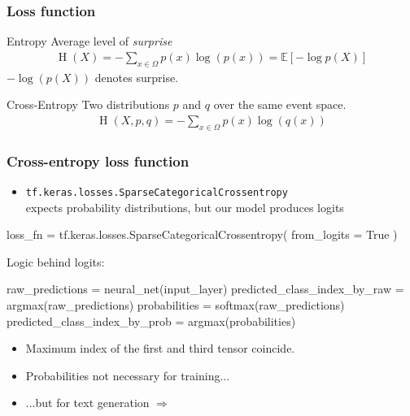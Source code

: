 \documentclass[17pt,institute=e10]{tuhh_presentation}
\begin{document}
\begin{frame}
  \frametitle{Loss function}
  \begin{block}{Entropy}
    Average level of \emph{surprise}
    \begin{align*}
      \operatorname{H}(X) = -\sum_{x \in \Omega} p(x) \log(p(x)) = \mathbb{E}[-\log p(X)]
    \end{align*}
    $-\log(p (X))$ denotes surprise.
  \end{block}
  \pause
\vspace{1cm}
  \begin{block}{Cross-Entropy}
    Two distributions $p$ and $q$ over the same event space.
    \begin{align*}
      \operatorname{H}(X,p,q) = -\sum_{x \in \Omega} p(x) \log(q(x)) 
    \end{align*}
  \end{block}

\end{frame}

\begin{frame}[fragile]

  \frametitle{Cross-entropy loss function}

  \begin{itemize}
  \item \texttt{tf.keras.losses.SparseCategoricalCrossentropy} \\
  expects probability distributions,
   but our model produces logits
  \end{itemize}
\vspace{1cm}
  \begin{python}
  loss_fn = tf.keras.losses.SparseCategoricalCrossentropy( from_logits = True )
  \end{python}
  \pause
\vspace{1cm}
Logic behind logits:
\begin{python}
  raw_predictions = neural_net(input_layer)
  predicted_class_index_by_raw = argmax(raw_predictions)
  probabilities = softmax(raw_predictions)
  predicted_class_index_by_prob = argmax(probabilities)
\end{python}
\pause
\begin{itemize}
  \item Maximum index of the first and third tensor coincide. 
  \item Probabilities not necessary for training...
  \pause
  \item ...but for text generation $\Rightarrow$
\end{itemize}

\end{frame}
\end{document}
